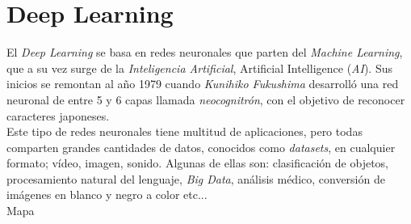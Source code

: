 \section{Deep Learning}
\label{sec:deeplearning}
El \textit{Deep Learning} se basa en redes neuronales que parten del \textit{Machine Learning}, que a su vez surge de la \textit{Inteligencia Artificial}, Artificial Intelligence (\textit{AI}). Sus inicios se remontan al año 1979 cuando \textit{Kunihiko Fukushima} desarrolló una red neuronal de entre 5 y 6 capas llamada \textit{neocognitrón}\cite{neocognitron}, con el objetivo de reconocer caracteres japoneses.\\

Este tipo de redes neuronales tiene multitud de aplicaciones, pero todas comparten grandes cantidades de datos, conocidos como \textit{datasets}, en cualquier formato; vídeo, imagen, sonido. Algunas de ellas son: clasificación de objetos, procesamiento natural del lenguaje, \textit{Big Data}, análisis médico, conversión de imágenes en blanco y negro a color etc...\\

Mapa